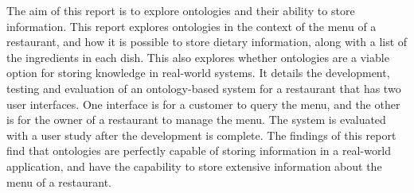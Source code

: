 \abstracttitle
%
{\singlespacing
The aim of this report is to explore ontologies and their ability to store information. This report explores ontologies in the context of the menu of a restaurant, and how it is possible to store dietary information, along with a list of the ingredients in each dish. This also explores whether ontologies are a viable option for storing knowledge in real-world systems. It details the development, testing and evaluation of an ontology-based system for a restaurant that has two user interfaces. One interface is for a customer to query the menu, and the other is for the owner of a restaurant to manage the menu. The system is evaluated with a user study after the development is complete. The findings of this report find that ontologies are perfectly capable of storing information in a real-world application, and have the capability to store extensive information about the menu of a restaurant.
}

